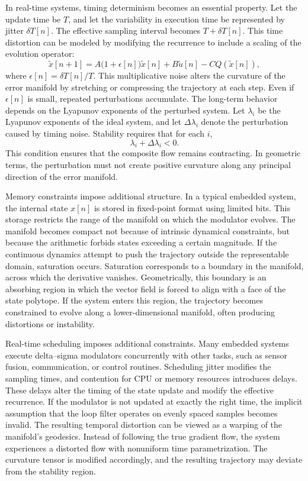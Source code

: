 In real-time systems, timing determinism becomes an essential property. Let the update time be \(T\), and let the variability in execution time be represented by jitter \(\delta T[n]\). The effective sampling interval becomes \(T + \delta T[n]\). This time distortion can be modeled by modifying the recurrence to include a scaling of the evolution operator:
\[
\tilde{x}[n+1] = A\bigl( 1 + \epsilon[n] \bigr)\tilde{x}[n] + B \tilde{u}[n] - C Q(\tilde{x}[n]),
\]
where \(\epsilon[n] = \delta T[n] / T\). This multiplicative noise alters the curvature of the error manifold by stretching or compressing the trajectory at each step. Even if \(\epsilon[n]\) is small, repeated perturbations accumulate. The long-term behavior depends on the Lyapunov exponents of the perturbed system. Let \(\lambda_{i}\) be the Lyapunov exponents of the ideal system, and let \(\Delta\lambda_{i}\) denote the perturbation caused by timing noise. Stability requires that for each \(i\),
\[
\lambda_{i} + \Delta\lambda_{i} < 0.
\]
This condition ensures that the composite flow remains contracting. In geometric terms, the perturbation must not create positive curvature along any principal direction of the error manifold.

Memory constraints impose additional structure. In a typical embedded system, the internal state \(x[n]\) is stored in fixed-point format using limited bits. This storage restricts the range of the manifold on which the modulator evolves. The manifold becomes compact not because of intrinsic dynamical constraints, but because the arithmetic forbids states exceeding a certain magnitude. If the continuous dynamics attempt to push the trajectory outside the representable domain, saturation occurs. Saturation corresponds to a boundary in the manifold, across which the derivative vanishes. Geometrically, this boundary is an absorbing region in which the vector field is forced to align with a face of the state polytope. If the system enters this region, the trajectory becomes constrained to evolve along a lower-dimensional manifold, often producing distortions or instability.

Real-time scheduling imposes additional constraints. Many embedded systems execute delta–sigma modulators concurrently with other tasks, such as sensor fusion, communication, or control routines. Scheduling jitter modifies the sampling times, and contention for CPU or memory resources introduces delays. These delays alter the timing of the state update and modify the effective recurrence. If the modulator is not updated at exactly the right time, the implicit assumption that the loop filter operates on evenly spaced samples becomes invalid. The resulting temporal distortion can be viewed as a warping of the manifold’s geodesics. Instead of following the true gradient flow, the system experiences a distorted flow with nonuniform time parametrization. The curvature tensor is modified accordingly, and the resulting trajectory may deviate from the stability region.

